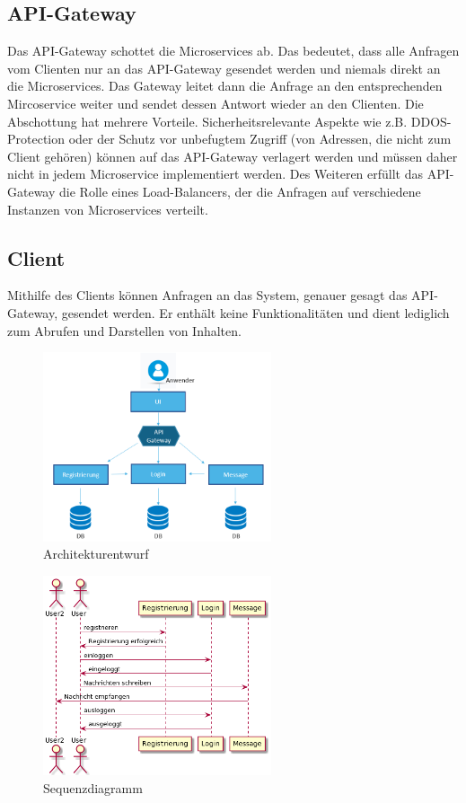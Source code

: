 \subsection{API-Gateway}
Das API-Gateway schottet die Microservices ab. Das bedeutet, dass alle Anfragen vom Clienten nur an das API-Gateway gesendet werden und niemals direkt an die Microservices. Das Gateway leitet dann die Anfrage an den entsprechenden Mircoservice weiter und sendet dessen Antwort wieder an den Clienten. Die Abschottung hat mehrere Vorteile. Sicherheitsrelevante Aspekte wie z.B. DDOS-Protection oder der Schutz vor unbefugtem Zugriff (von Adressen, die nicht zum Client gehören) können auf das API-Gateway verlagert werden und müssen daher nicht in jedem Microservice implementiert werden.
Des Weiteren erfüllt das API-Gateway die Rolle eines Load-Balancers, der die Anfragen auf verschiedene Instanzen von Microservices verteilt. 

\subsection{Client}
Mithilfe des Clients können Anfragen an das System, genauer gesagt das API-Gateway, gesendet werden. Er enthält keine Funktionalitäten und dient lediglich zum Abrufen und Darstellen von Inhalten.

\begin{figure}[bth] 
	\centering
	\includegraphics[width=0.6\textwidth]{Graphics/Architekturentwurf.png}
	\caption{Architekturentwurf}
\end{figure}

\begin{figure}[bth] 
	\centering
	\includegraphics[width=0.6\textwidth]{Graphics/Sequenzdiagramm.png}
	\caption{Sequenzdiagramm}
\end{figure}

